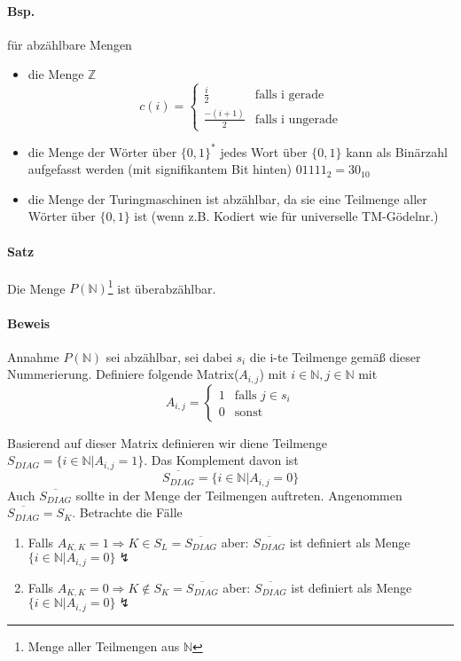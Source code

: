 \paragraph*{Bsp.} für abzählbare Mengen
\begin{itemize}
	\item die Menge $\mathbb{Z}$ $$ c(i)= \begin{cases}\frac{i}{2} & \text{falls i gerade}\\ \frac{-(i+1)}{2} & \text{falls i ungerade}\end{cases} $$ %
	\item die Menge der Wörter über $\{0,1\}^*$ jedes Wort über $\{0,1\}$ kann als Binärzahl aufgefasst werden (mit signifikantem Bit hinten) $01111_2=30_{10}$
	\item die Menge der Turingmaschinen ist abzählbar, da sie eine Teilmenge aller Wörter über $\{0,1\}$ ist (wenn z.B. Kodiert wie für universelle TM-Gödelnr.)
\end{itemize}

\paragraph*{Satz} Die Menge $P(\mathbb{N})$\footnote{Menge aller Teilmengen aus $\mathbb{N}$} ist überabzählbar.

\paragraph*{Beweis} Annahme $P(\mathbb{N})$ sei abzählbar, sei dabei $s_i$ die i-te Teilmenge gemäß dieser Nummerierung. Definiere folgende Matrix($A_{i,j}$) mit $i\in\mathbb{N},j\in\mathbb{N}$ mit $$ A_{i,j} = \begin{cases}1&\text{falls } j\in s_i \\ 0 & \text{sonst}\end{cases} $$ 

\par\medskip Basierend auf dieser Matrix definieren wir diene Teilmenge $S_{DIAG}=\{ i\in\mathbb{N}|A_{i,j}=1 \}$. Das Komplement davon ist $$ \overline{S_{DIAG}}=\{i\in\mathbb{N}|A_{i,j}=0\} $$ Auch $\overline{S_{DIAG}}$ sollte in der Menge der Teilmengen auftreten. Angenommen $\overline{S_{DIAG}} = S_K$. Betrachte die Fälle \par\medskip
\begin{enumerate}
	\item Falls $A_{K,K}=1 \Rightarrow K \in S_L = \overline{S_{DIAG}}$ aber: $\overline{S_{DIAG}}$ ist definiert als Menge $\{i\in\mathbb{N}|A_{i,j}=0\} \lightning$ 
	\item Falls $A_{K,K}=0 \Rightarrow K \not\in S_K = \overline{S_{DIAG}}$ aber: $\overline{S_{DIAG}}$ ist definiert als Menge $\{i\in\mathbb{N}|A_{i,j}=0\} \lightning$
\end{enumerate}

